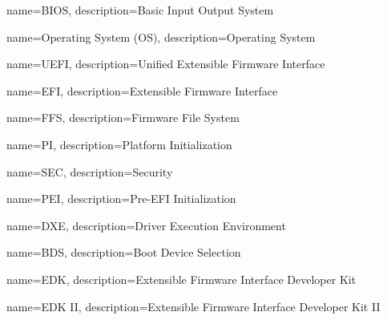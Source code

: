  {
    name=BIOS,
    description={Basic Input Output System
    }
}

 {
    name=Operating System (OS),
    description={Operating System
    }
}

 {
    name=UEFI,
    description={Unified Extensible Firmware Interface
    }
}

 {
    name=EFI,
    description={Extensible Firmware Interface
    }
}


 {
    name=FFS,
    description={Firmware File System
    }
}

 {
    name=PI,
    description={Platform Initialization
    }
}

 {
    name=SEC,
    description={Security
    }
}

 {
    name=PEI,
    description={Pre-EFI Initialization
    }
}


 {
    name=DXE,
    description={Driver Execution Environment
    }
}


 {
    name=BDS,
    description={Boot Device Selection
    }
}

 {
    name=EDK,
    description={Extensible Firmware Interface Developer Kit
    }
}

 {
    name=EDK II,
    description={Extensible Firmware Interface Developer Kit II
    }
}


